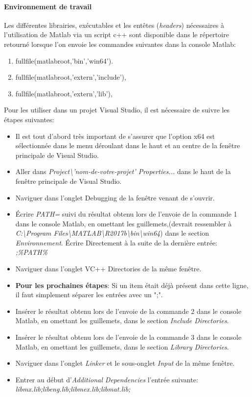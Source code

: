 \paragraph{Environnement de travail} Les différentes librairies, exécutables et les entêtes (\textit{headers})  nécessaires à l'utilisation de Matlab via un script c++ sont disponible dans le répertoire retourné lorsque l'on envoie les commandes suivantes dans la console Matlab:
\begin{enumerate}
\item fullfile(matlabroot,'bin','win64').
\item fullfile(matlabroot,'extern','include'),
\item fullfile(matlabroot,'extern','lib'),
\end{enumerate}

Pour les utiliser dans un projet Visual Studio, il est nécessaire de suivre les étapes suivantes:
\begin{itemize}
\item Il est tout d'abord très important de s'assurer que l'option x64 est sélectionnée dans le menu déroulant dans le haut et au centre de la fenêtre principale de Visual Studio.
\item Aller dans \textit{Project\textbackslash'nom-de-votre-projet' Properties...} dans le haut de la fenêtre principale de Visual Studio.
\item Naviguer dans l'onglet Debugging de la fenêtre venant de s'ouvrir.
\item Écrire \textit{PATH=} suivi du résultat obtenu lors de l'envoie de la commande 1 dans le console Matlab, en omettant les guillemets,(devrait ressembler à \newline \textit{C:\textbackslash Program Files\textbackslash MATLAB\textbackslash R2017b\textbackslash bin\textbackslash win64}) dans le section \textit{Environnement}.
Écrire Directement à la suite de la dernière entrée: \textit{;\%PATH\%}
\item Naviguer dans l'onglet VC++ Directories de la même fenêtre.
\item \textbf{Pour les prochaines étapes}: Si un item était déjà présent dans cette ligne, il faut simplement séparer les entrées avec un ";".
\item Insérer le résultat obtenu lors de l'envoie de la commande 2 dans le console Matlab, en omettant les guillemets, dans le section \textit{Include Directories}.
\item Insérer le résultat obtenu lors de l'envoie de la commande 3 dans le console Matlab, en omettant les guillemets, dans le section \textit{Library Directories}.
\item Naviguer dans l'onglet \textit{Linker} et le sous-onglet \textit{Input} de la même fenêtre.
\item Entrer au début d'\textit{Additional Dependencies} l'entrée suivante: \textit{libmx.lib;libeng.lib;libmex.lib;libmat.lib;}
\end{itemize}

